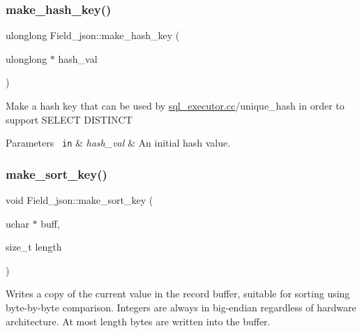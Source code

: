 \mbox{\label{classField__json_ad9ff7288981a5d476df6b8362d4891cd}} 
\subsubsection{\texorpdfstring{make\+\_\+hash\+\_\+key()}{make\_hash\_key()}}
{\footnotesize\ttfamily ulonglong Field\+\_\+json\+::make\+\_\+hash\+\_\+key (\begin{DoxyParamCaption}\item[{ulonglong $\ast$}]{hash\+\_\+val }\end{DoxyParamCaption})}

Make a hash key that can be used by \mbox{\hyperlink{sql__executor_8cc}{sql\+\_\+executor.\+cc}}/unique\+\_\+hash in order to support S\+E\+L\+E\+CT D\+I\+S\+T\+I\+N\+CT


\begin{DoxyParams}[1]{Parameters}
\mbox{\texttt{ in}}  & {\em hash\+\_\+val} & An initial hash value. \\
\hline
\end{DoxyParams}
\mbox{\label{classField__json_a601df7458aaa98d5c1f80d5bc2d35f3d}} 
\subsubsection{\texorpdfstring{make\+\_\+sort\+\_\+key()}{make\_sort\_key()}}
{\footnotesize\ttfamily void Field\+\_\+json\+::make\+\_\+sort\+\_\+key (\begin{DoxyParamCaption}\item[{uchar $\ast$}]{buff,  }\item[{size\+\_\+t}]{length }\end{DoxyParamCaption})\hspace{0.3cm}{\ttfamily [virtual]}}

Writes a copy of the current value in the record buffer, suitable for sorting using byte-\/by-\/byte comparison. Integers are always in big-\/endian regardless of hardware architecture. At most length bytes are written into the buffer.


